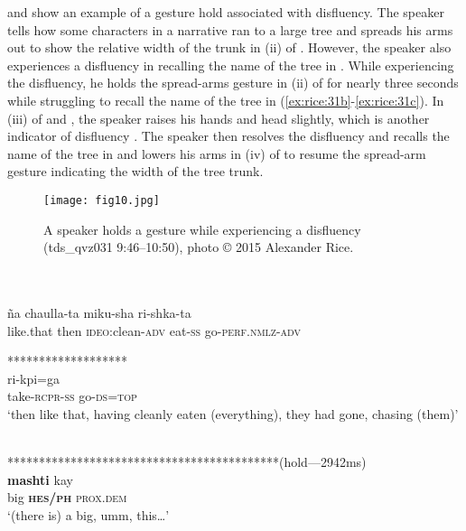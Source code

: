 \documentclass[output=paper]{langscibook}
\begin{document}
 and  show an example of a gesture hold associated with disfluency. The speaker tells how some characters in a narrative ran to a large tree and spreads his arms out to show the relative width of the trunk in (ii) of . However, the speaker also experiences a disfluency in recalling the name of the tree in . While experiencing the disfluency, he holds the spread-arms gesture in (ii) of  for nearly three seconds while struggling to recall the name of the tree in (\ref{ex:rice:31b}-\ref{ex:rice:31c}). In (iii) of  and , the speaker raises his hands and head slightly, which is another indicator of disfluency \citep{Ozkan2023}. The speaker then resolves the disfluency and recalls the name of the tree in  and lowers his arms in (iv) of  to resume the spread-arm gesture indicating the width of the tree trunk.

  
\begin{figure}
\texttt{[image: fig10.jpg]}
\caption{\label{fig:rice:10}A speaker holds a gesture while experiencing a disfluency (tds\_qvz031 9:46--10:50), photo © 2015 Alexander Rice.}
\end{figure}

\ea%
    \label{ex:rice:31}
\ea \label{ex:rice:31a}
 \\
\glt {\hspace{22mm}}{**************************************}\\
 {ña} {chaulla-ta} {miku-sha} {ri-shka-ta} \\
{like.that} {then} {\textsc{ideo}:clean-\textsc{adv}} {eat-\textsc{ss}}   {go-\textsc{perf.nmlz-adv}}\\
\medskip

\gl********************\\
 {ri-kpi=ga}\\
{take-\textsc{rcpr-ss}} {go-\textsc{ds=top}}\\
\glt ‘then like that, having cleanly eaten (everything), they had gone, chasing (them)’
\medskip


\ex \label{ex:rice:31b}
 \\
\glt********************************************(hold—2942ms)\\
 {\textbf{mashti}} {kay} {}\\
{big} {\textbf{\textsc{hes/ph}}} {\textsc{prox.dem}} {}\\
\glt ‘(there is) a big, umm, this…’
\medskip
\end{document}
